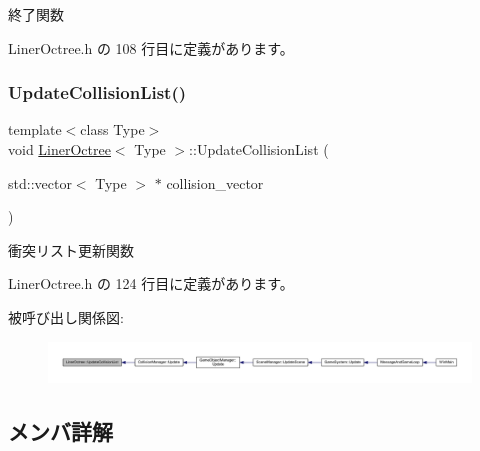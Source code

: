 終了関数 



 Liner\+Octree.\+h の 108 行目に定義があります。

\mbox{\label{class_liner_octree_a880276cc9099c29f447f3ca0043b9ce9}} 
\subsubsection{\texorpdfstring{Update\+Collision\+List()}{UpdateCollisionList()}}
{\footnotesize\ttfamily template$<$class Type$>$ \\
void \mbox{\hyperlink{class_liner_octree}{Liner\+Octree}}$<$ Type $>$\+::Update\+Collision\+List (\begin{DoxyParamCaption}\item[{std\+::vector$<$ Type $>$ $\ast$}]{collision\+\_\+vector }\end{DoxyParamCaption})\hspace{0.3cm}{\ttfamily [inline]}}



衝突リスト更新関数 



 Liner\+Octree.\+h の 124 行目に定義があります。

被呼び出し関係図\+:
\nopagebreak
\begin{figure}[H]
\begin{center}
\leavevmode
\includegraphics[width=350pt]{class_liner_octree_a880276cc9099c29f447f3ca0043b9ce9_icgraph}
\end{center}
\end{figure}


\subsection{メンバ詳解}
\mbox{\label{class_liner_octree_aff1d6fcdf606bb2e42461714c0e7aa50}} 
